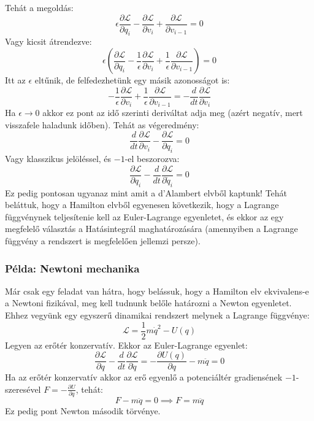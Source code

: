 \documentclass[../main.tex]{subfiles}
\begin{document}
Tehát a megoldás:
\begin{equation}
    \epsilon \frac{\partial \mathcal{L}}{\partial q_i} - \frac{\partial \mathcal{L}}{\partial v_i} + \frac{\partial \mathcal{L}}{\partial v_{i-1}} = 0
\end{equation}
Vagy kicsit átrendezve:
\begin{equation}
    \epsilon \left( \frac{\partial \mathcal{L}}{\partial q_i} - \frac{1}{\epsilon}\frac{\partial \mathcal{L}}{\partial v_i} + \frac{1}{\epsilon}\frac{\partial \mathcal{L}}{\partial v_{i-1}}\right) = 0
\end{equation}
Itt az $\epsilon$ eltűnik, de felfedezhetünk egy másik azonosságot is:
\begin{equation}
    -\frac{1}{\epsilon}\frac{\partial \mathcal{L}}{\partial v_i} + \frac{1}{\epsilon}\frac{\partial \mathcal{L}}{\partial v_{i-1}} = -\frac{d}{dt} \frac{\partial \mathcal{L}}{\partial v_i}
\end{equation}
Ha $\epsilon \to 0$ akkor ez pont az idő szerinti deriváltat adja meg (azért negatív, mert visszafele haladunk időben). Tehát as végeredmény:
\begin{equation}
    \frac{d}{dt} \frac{\partial \mathcal{L}}{\partial v_i} - \frac{\partial \mathcal{L}}{\partial q_i} = 0
\end{equation}
Vagy klasszikus jelöléssel, és $-1$-el beszorozva:
\begin{equation}
    \frac{\partial \mathcal{L}}{\partial q_i} - \frac{d}{dt} \frac{\partial \mathcal{L}}{\partial \dot{q}_i} = 0
\end{equation}
Ez pedig pontosan ugyanaz mint amit a d'Alambert elvből kaptunk! Tehát beláttuk, hogy a Hamilton elvből egyenesen következik, hogy a Lagrange függvénynek teljesítenie kell az Euler-Lagrange egyenletet, és ekkor az egy megfelelő választás a Hatásintegrál maghatározására (amennyiben a Lagrange függvény a rendszert is megfelelően jellemzi persze).

\subsubsection*{Példa: Newtoni mechanika}
Már csak egy feladat van hátra, hogy belássuk, hogy a Hamilton elv ekvivalens-e a Newtoni fizikával, meg kell tudnunk belőle határozni a Newton egyenletet. Ehhez vegyünk egy egyszerű dinamikai rendszert melynek a Lagrange függvénye:
\begin{equation}
    \mathcal{L} = \frac{1}{2} m \dot{q}^2 - U(q)
\end{equation}
Legyen az erőtér konzervatív. Ekkor az Euler-Lagrange egyenlet:
\begin{equation}
    \frac{\partial \mathcal{L}}{\partial q} - \frac{d}{dt} \frac{\partial \mathcal{L}}{\partial \dot{q}} = - \frac{\partial U(q)}{\partial q} - m \ddot{q} = 0 
\end{equation}
Ha az erőtér konzervatív akkor az erő egyenlő a potenciáltér gradiensének $-1$-szeresével $F = -\frac{\partial U}{\partial q}$, tehát:
\begin{equation}
    F - m \ddot{q} = 0 \implies F = m \ddot{q}
\end{equation}
Ez pedig pont Newton második törvénye.
\end{document}
